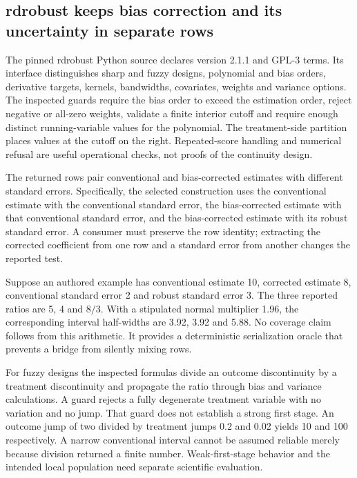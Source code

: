 \subsection{rdrobust keeps bias correction and its uncertainty in separate rows}
The pinned rdrobust Python source declares version 2.1.1 and GPL-3 terms.
Its interface distinguishes sharp and fuzzy designs, polynomial and bias
orders, derivative targets, kernels, bandwidths, covariates, weights and
variance options. The inspected guards require the bias order to exceed
the estimation order, reject negative or all-zero weights, validate a
finite interior cutoff and require enough distinct running-variable values
for the polynomial. The treatment-side partition places values at the
cutoff on the right. Repeated-score handling and numerical refusal are
useful operational checks, not proofs of the continuity design.
\citep{exec25_pyrdiv_rdrobust}

The returned rows pair conventional and bias-corrected estimates with
different standard errors. Specifically, the selected construction uses
the conventional estimate with the conventional standard error, the
bias-corrected estimate with that conventional standard error, and the
bias-corrected estimate with its robust standard error. A consumer must
preserve the row identity; extracting the corrected coefficient from one
row and a standard error from another changes the reported test.
\citep{exec25_pyrdiv_rdrobust}

Suppose an authored example has conventional estimate 10, corrected
estimate 8, conventional standard error 2 and robust standard error 3.
The three reported ratios are 5, 4 and $8/3$. With a stipulated normal
multiplier 1.96, the corresponding interval half-widths are 3.92, 3.92
and 5.88. No coverage claim follows from this arithmetic. It provides a
deterministic serialization oracle that prevents a bridge from silently
mixing rows.\citep{exec25_pyrdiv_choice}

For fuzzy designs the inspected formulas divide an outcome discontinuity
by a treatment discontinuity and propagate the ratio through bias and
variance calculations. A guard rejects a fully degenerate treatment
variable with no variation and no jump. That guard does not establish a
strong first stage. An outcome jump of two divided by treatment jumps
0.2 and 0.02 yields 10 and 100 respectively. A narrow conventional interval
cannot be assumed reliable merely because division returned a finite
number. Weak-first-stage behavior and the intended local population need
separate scientific evaluation.\citep{exec25_pyrdiv_rdrobust,
exec25_pyrdiv_choice}

